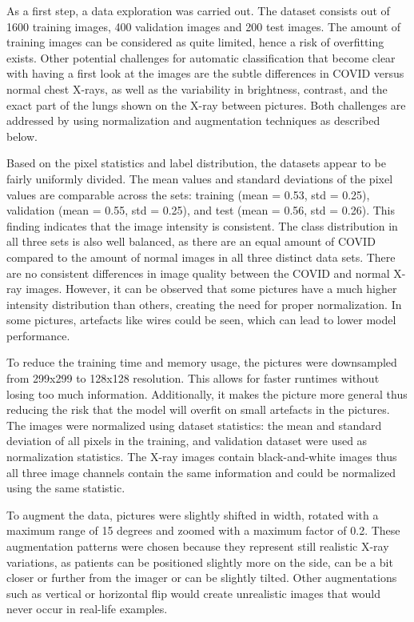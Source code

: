 \documentclass[conference]{IEEEtran}
\begin{document}
As a first step, a data exploration was carried out. The dataset consists out of 1600 training images, 400 validation images and 200 test images. The amount of training images can be considered as quite limited, hence a risk of overfitting exists. Other potential challenges for automatic classification that become clear with having a first look at the images are the subtle differences in COVID versus normal chest X-rays, as well as the variability in brightness, contrast, and the exact part of the lungs shown on the X-ray between pictures. Both challenges are addressed by using normalization and augmentation techniques as described below. 

Based on the pixel statistics and label distribution, the datasets appear to be fairly uniformly divided.  The mean values and standard deviations of the pixel values are comparable across the sets: training (mean = 0.53, std = 0.25), validation (mean = 0.55, std = 0.25), and test (mean = 0.56, std = 0.26). This finding indicates that the image intensity is consistent. The class distribution in all three sets is also well balanced, as there are an equal amount of COVID compared to the amount of normal images in all three distinct data sets. There are no consistent differences in image quality between the COVID and normal X-ray images. However, it can be observed that some pictures have a much higher intensity distribution than others, creating the need for proper normalization. In some pictures, artefacts like wires could be seen, which can lead to lower model performance. 

To reduce the training time and memory usage, the pictures were downsampled from 299x299 to 128x128 resolution. This allows for faster runtimes without losing too much information. Additionally, it makes the picture more general thus reducing the risk that the model will overfit on small artefacts in the pictures. The images were normalized using dataset statistics: the mean and standard deviation of all pixels in the training, and validation dataset were used as normalization statistics. The X-ray images contain black-and-white images thus all three image channels contain the same information and could be normalized using the same statistic. 

To augment the data, pictures were slightly shifted in width, rotated with a maximum range of 15 degrees and zoomed with a maximum factor of 0.2. These augmentation patterns were chosen because they represent still realistic X-ray variations, as patients can be positioned slightly more on the side, can be a bit closer or further from the imager or can be slightly tilted. Other augmentations such as vertical or horizontal flip would create unrealistic images that would never occur in real-life examples.
\end{document}

